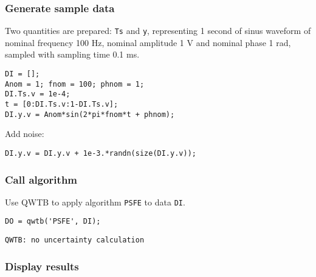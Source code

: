 \startcontents[localtoc]



{}
\subsubsection*{Generate sample data}



Two quantities are prepared: \texttt{Ts} and \texttt{y}, representing 1 second of sinus
waveform of nominal frequency 100 Hz, nominal amplitude 1 V and nominal phase
1 rad, sampled with sampling time 0.1 ms.

\begin{lstlisting}
DI = [];
Anom = 1; fnom = 100; phnom = 1;
DI.Ts.v = 1e-4;
t = [0:DI.Ts.v:1-DI.Ts.v];
DI.y.v = Anom*sin(2*pi*fnom*t + phnom);
\end{lstlisting}


Add noise:

\begin{lstlisting}
DI.y.v = DI.y.v + 1e-3.*randn(size(DI.y.v));
\end{lstlisting}


{}
\subsubsection*{Call algorithm}



Use QWTB to apply algorithm \texttt{PSFE} to data \texttt{DI}.

\begin{lstlisting}
DO = qwtb('PSFE', DI);
\end{lstlisting}
\begin{lstlisting}[language={},xleftmargin=5pt,frame=none]
QWTB: no uncertainty calculation

\end{lstlisting}


{}
\subsubsection*{Display results}



